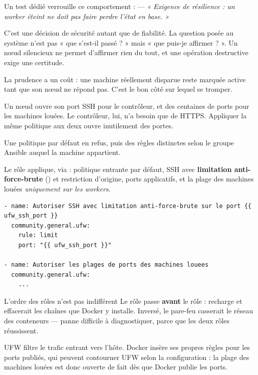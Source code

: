 Un test dédié verrouille ce comportement :
 --- \emph{« Exigence de
résilience : un worker éteint ne doit pas faire perdre l'état en base. »}

\begin{retenir}
C'est une décision de sécurité autant que de fiabilité. La question posée au
système n'est pas « que s'est-il passé ? » mais « que puis-je affirmer ? ».
Un nœud silencieux ne permet d'affirmer rien du tout, et une opération
destructive exige une certitude.
\end{retenir}

\limite
La prudence a un coût : une machine réellement disparue reste marquée active
tant que son nœud ne répond pas. C'est le bon côté sur lequel se tromper.


\menace
Un nœud ouvre son port SSH pour le contrôleur, et des centaines de ports pour
les machines louées. Le contrôleur, lui, n'a besoin que de HTTPS. Appliquer la
même politique aux deux ouvre inutilement des portes.

\parade
Une politique par défaut en refus, puis des règles distinctes selon le groupe
Ansible auquel la machine appartient.

\danslecode
Le rôle  applique, via  :
politique entrante par défaut, SSH avec \textbf{limitation anti-force-brute}
() et restriction d'origine, ports applicatifs, et la plage des
machines louées \emph{uniquement sur les workers}.

\begin{lstlisting}
- name: Autoriser SSH avec limitation anti-force-brute sur le port {{ ufw_ssh_port }}
  community.general.ufw:
    rule: limit
    port: "{{ ufw_ssh_port }}"

- name: Autoriser les plages de ports des machines louees
  community.general.ufw:
    ...
\end{lstlisting}

\begin{piege}{L'ordre des rôles n'est pas indifférent}
Le rôle passe \textbf{avant} le rôle  :  recharge
 et effacerait les chaînes que Docker y installe. Inversé, le
pare-feu casserait le réseau des conteneurs --- panne difficile à diagnostiquer,
parce que les deux rôles réussissent.
\end{piege}

\limite
UFW filtre le trafic entrant vers l'hôte. Docker insère ses propres règles
 pour les ports publiés, qui peuvent contourner UFW selon la
configuration : la plage des machines louées est donc ouverte de fait dès que
Docker publie les ports.
